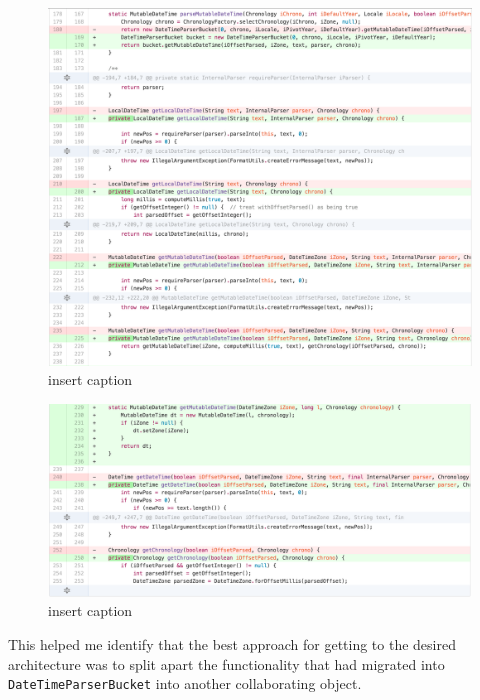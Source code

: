 \begin{figure}[H]
	\centering
	\includegraphics[width=\linewidth]{code65}
	\caption{insert caption}
\end{figure}
\begin{figure}[H]
	\centering
	\includegraphics[width=\linewidth]{code66}
	\caption{insert caption}
\end{figure}

This helped me identify that the best approach for getting to the desired architecture was to split apart the functionality that had migrated into \texttt{DateTimeParserBucket} into another collaborating object.

